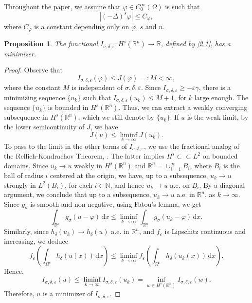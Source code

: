 \documentclass[11pt, reqno]{amsart}
\newtheorem{proposition}{Proposition}
\numberwithin{equation}{section}
\numberwithin{theorem}{section}
\numberwithin{lemma}{section}
\numberwithin{corollary}{section}
\numberwithin{remark}{section}
\numberwithin{proposition}{section}
\numberwithin{definition}{section}
\newcommand{\dd}{\, \mathrm{d}}
\newcommand{\R}{\mathbb{R}}
\newcommand{\e}{\varepsilon}
\begin{document}
Throughout the paper, we assume that $\varphi\in C_0^\infty(\Omega)$ is such that
\begin{equation}\label{condition on varphi}
    |(-\Delta)^s\varphi|\le C_\varphi,
\end{equation}
where $C_\varphi$ is a constant depending only on $\varphi$, $s$ and $n$.
\begin{proposition}\label{existence}
    The functional $I_{\sigma,\delta,\varepsilon}:H^s(\R^n) \longrightarrow \R$, defined by \eqref{2.1}, has a minimizer.
\end{proposition}
\begin{proof}
    Observe that
	$$
	I_{\sigma,\delta,\e}(\varphi)\le J(\varphi)=:M<\infty,
	$$ where the constant $M$ is independent of $\sigma,\delta,\e$. Since $I_{\sigma,\delta,\varepsilon}\ge -\e \gamma$, there is a minimizing sequence $\{u_k\}$ such that $I_{\sigma,\delta,\varepsilon}(u_k)\le M+1$, for $k$ large enough. The sequence $\{u_k\}$ is bounded in $H^s(\R^n)$. Thus, we can extract a weakly converging subsequence in $H^s(\R^n)$, which we still denote by $\{u_k\}$. If $u$ is the weak limit, by the lower semicontinuity of $J$, we have
	$$
	J(u)\le\liminf_{k\to\infty} J(u_k).
        $$
    To pass to the limit in the other terms of $I_{\sigma,\delta,\varepsilon}$, we use the fractional analog of the Rellich-Kondrachov Theorem, \cite[Theorem 7.1]{DPV12}. The latter implies $H^s\subset\subset L^2$ on bounded domains. Since $u_k\to u$ weakly in $H^s(\R^n)$ and $\R^n=\displaystyle\cup_{i=1}^\infty B_i$, where $B_i$ is the ball of radius $i$ centered at the origin, we have, up to a subsequence, $u_k\to u$ strongly in $L^2(B_i)$, for each $i\in\mathbb{N}$, and hence $u_k\to u$ a.e. on $B_i$. By a diagonal argument, we conclude that up to a subsequence, $u_k\to u$ a.e. in $\R^n$, as $k\to\infty$. Since $g_\sigma$ is smooth and non-negative, using Fatou's lemma, we get
     $$
     \int_{\R^n}g_\sigma(u-\varphi)\dd x\le\liminf_{k\to\infty}\int_{\R^n}g_\sigma(u_k-\varphi)\dd x.
     $$        
            Similarly, since $h_\delta(u_k)\to h_\delta(u)$ a.e. in $\R^n$, and $f_{\varepsilon}$ is Lipschitz continuous and increasing, we deduce      
        $$
        f_\varepsilon\left(\int_{\Omega^c} h_\delta(u(x))\dd x\right)\le\liminf_{k\to\infty}f_\varepsilon\left(\int_{\Omega^c}           h_\delta(u_k(x))\dd x\right).                  
	$$
	Hence, 
	$$
	I_{\sigma,\delta,\e}(u) \le \liminf_{k\to\infty} I_{\sigma,\delta,\e}(u_k)= \inf_{w\in H^s(\R^n)}  I_{\sigma,\delta,\e}(w).
	$$
    Therefore, $u$ is a minimizer of $I_{\sigma,\delta,\e}$.
\end{proof}
\end{document}
